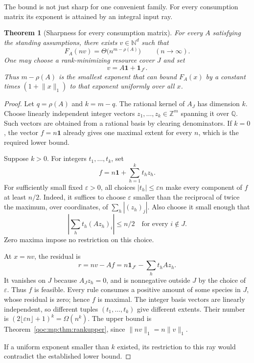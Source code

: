 \documentclass[11pt,letterpaper]{article}
\newtheorem{theorem}{Theorem}[section]
\theoremstyle{definition}
\theoremstyle{remark}
\newcommand{\N}{\mathbb N}
\newcommand{\Z}{\mathbb Z}
\newcommand{\Q}{\mathbb Q}
\newcommand{\one}{\mathbf 1}
\newcommand{\size}[1]{\lVert #1\rVert_1}
\begin{document}
The bound is not just sharp for one convenient family. For every
consumption matrix its exponent is attained by an integral input ray.

\begin{theorem}[Sharpness for every consumption matrix]\label{qoc:mp:thm:ranksharp}
For every $A$ satisfying the standing assumptions, there exists
$v\in\N^d$ such that
\begin{equation}\label{qoc:mp:eq:ranksharp}
 F_A(nv)=\Theta\bigl(n^{m-\rho(A)}\bigr)
 \qquad(n\longrightarrow\infty).
\end{equation}
One may choose a rank-minimizing resource cover $J$ and set
\begin{equation}\label{qoc:mp:eq:sharpray}
 v=A\one+\one_{J^c}.
\end{equation}
Thus $m-\rho(A)$ is the smallest exponent that can bound $F_A(x)$ by a
constant times $(1+\size x)$ to that exponent uniformly over all $x$.
\end{theorem}
\begin{proof}
Let $q=\rho(A)$ and $k=m-q$. The rational kernel of $A_J$ has dimension
$k$. Choose linearly independent integer vectors
$z_1,\ldots,z_k\in\Z^m$ spanning it over $\Q$. Such vectors are obtained
from a rational basis by clearing denominators. If $k=0$, the vector
$f=n\one$ already gives one maximal extent for every $n$, which is the
required lower bound.

Suppose $k>0$. For integers $t_1,\ldots,t_k$, set
\[
 f=n\one+\sum_{h=1}^k t_hz_h.
\]
For sufficiently small fixed $\varepsilon>0$, all choices
$|t_h|\le\varepsilon n$ make every component of $f$ at least $n/2$.
Indeed, it suffices to choose $\varepsilon$ smaller than the reciprocal
of twice the maximum, over coordinates, of
$\sum_h|(z_h)_j|$. Also choose it small enough that
\[
 \left|\sum_h t_h(Az_h)_i\right|\le n/2
 \quad\text{for every }i\notin J.
\]
Zero maxima impose no restriction on this choice.

At $x=nv$, the residual is
\[
 r=nv-Af=n\one_{J^c}-\sum_h t_hAz_h.
\]
It vanishes on $J$ because $A_Jz_h=0$, and is nonnegative outside $J$ by
the choice of $\varepsilon$. Thus $f$ is feasible. Every rule consumes a
positive amount of some species in $J$, whose residual is zero; hence
$f$ is maximal. The integer basis vectors are linearly independent, so
different tuples $(t_1,\ldots,t_k)$ give different extents. Their number
is $(2\lfloor\varepsilon n\rfloor+1)^k=\Omega(n^k)$. The upper bound is
Theorem~\ref{qoc:mp:thm:rankupper}, since $\size{nv}=n\size v$.

If a uniform exponent smaller than $k$ existed, its restriction to this
ray would contradict the established lower bound.
\end{proof}
\end{document}
